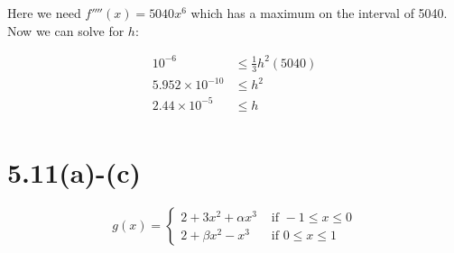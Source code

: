 \documentclass{article}
\begin{document}
Here we need $f''''(x) = 5040x^6$ which has a maximum on the interval of 5040. Now we can solve for $h$:

\begin{align*}
  10^{-6} &\leq \frac{1}{3} h^2 (5040) \\
  5.952 \times 10^{-10} &\leq h^2 \\
  2.44 \times 10^{-5} &\leq h \\
\end{align*}




\section*{5.11(a)-(c)}

\[
  g(x) =
  \begin{cases}
    2 + 3x^2 + \alpha x^3 &\text{ if } -1 \leq x \leq 0 \\
    2 + \beta x^2 - x^3 &\text{ if } 0 \leq x \leq 1
  \end{cases}
\]
\end{document}
